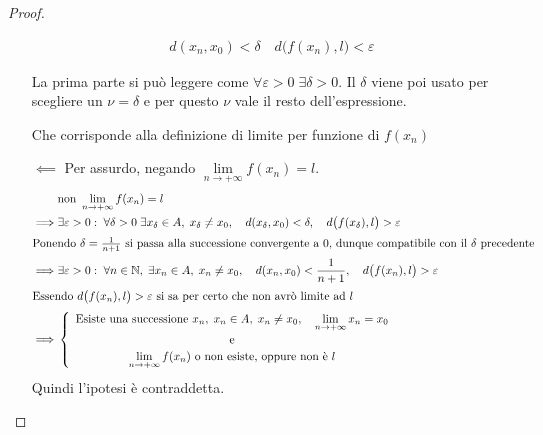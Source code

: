 \begin{proposition}
\begin{proof}
\begin{itemize}
\begin{equation*}
\begin{gathered}
						d(x_n, x_0) < \delta \quad d\bigl(f(x_n), l\bigr) < \varepsilon
					\end{gathered}
				\end{equation*}
				\begin{note}
					La prima parte si può leggere come $\forall \varepsilon > 0\; \exists \delta > 0$. Il $\delta$ viene poi usato per scegliere un $\nu = \delta$ e per questo $\nu$ vale il resto dell'espressione.
				\end{note}
				Che corrisponde alla definizione di limite per funzione di $f(x_n)$
			\item[$\impliedby$] Per assurdo, negando $\lim\limits_{n \to +\infty} f(x_n) = l$.
				\begin{align*}
					&\text{non } \lim\limits_{n \to +\infty} f(x_n) = l\\
					\implies & \exists \varepsilon > 0:\; \forall \delta > 0\; \exists x_\delta \in A,\; x_\delta \neq x_0, \quad d(x_\delta, x_0) < \delta, \quad d \bigl( f(x_\delta), l \bigr) > \varepsilon\\
					\intertext{Ponendo $\delta = \frac{1}{n+1}$ si passa alla successione convergente a $0$, dunque compatibile con il $\delta$ precedente}
					\implies & \exists \varepsilon > 0:\; \forall n \in \mathbb{N},\; \exists x_n \in A,\; x_n \neq x_0, \quad d(x_n, x_0) < \frac{1}{n+1}, \quad d \bigl( f(x_n), l \bigr) > \varepsilon\\
					\intertext{Essendo $d \bigl( f(x_n), l \bigr) > \varepsilon$ si sa per certo che non avrò limite ad $l$}
					\implies & \begin{cases}
						\begin{array}{c}
							\text{Esiste una successione } x_n,\; x_n \in A,\; x_n \neq x_0, \quad \lim\limits_{n \to +\infty} x_n = x_0\\
							\text{e}\\
							\lim\limits_{n \to +\infty} f(x_n) \text{ o non esiste, oppure non è } l
						\end{array}
					\end{cases}
				\end{align*}
				Quindi l'ipotesi è contraddetta.
		\end{itemize}
	\end{proof}
\end{proposition}

